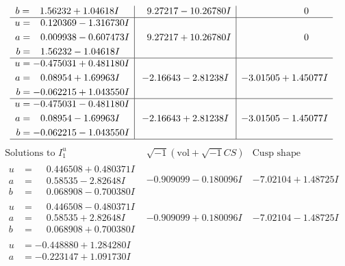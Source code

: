 \documentclass[1p]{elsarticle_modified}
\theoremstyle{definition}
\newcommand{\I}{\sqrt{-1}}
\begin{document}
$$\begin{array}{c|c|c}
\begin{aligned}
b &= \phantom{-}1.56232 + 1.04618 I\end{aligned}
 & \phantom{-}9.27217 - 10.26780 I & \phantom{-0.000000 } 0 \\ \hline\begin{aligned}
u &= \phantom{-}0.120369 - 1.316730 I \\
a &= \phantom{-}0.009938 - 0.607473 I \\
b &= \phantom{-}1.56232 - 1.04618 I\end{aligned}
 & \phantom{-}9.27217 + 10.26780 I & \phantom{-0.000000 } 0 \\ \hline\begin{aligned}
u &= -0.475031 + 0.481180 I \\
a &= \phantom{-}0.08954 + 1.69963 I \\
b &= -0.062215 + 1.043550 I\end{aligned}
 & -2.16643 - 2.81238 I & -3.01505 + 1.45077 I \\ \hline\begin{aligned}
u &= -0.475031 - 0.481180 I \\
a &= \phantom{-}0.08954 - 1.69963 I \\
b &= -0.062215 - 1.043550 I\end{aligned}
 & -2.16643 + 2.81238 I & -3.01505 - 1.45077 I\\
 \hline 
 \end{array}$$\newpage$$\begin{array}{c|c|c}  
\text{Solutions to }I^u_{1}& \I (\text{vol} + \sqrt{-1}CS) & \text{Cusp shape}\\
 \hline 
\begin{aligned}
u &= \phantom{-}0.446508 + 0.480371 I \\
a &= \phantom{-}0.58535 - 2.82648 I \\
b &= \phantom{-}0.068908 - 0.700380 I\end{aligned}
 & -0.909099 - 0.180096 I & -7.02104 + 1.48725 I \\ \hline\begin{aligned}
u &= \phantom{-}0.446508 - 0.480371 I \\
a &= \phantom{-}0.58535 + 2.82648 I \\
b &= \phantom{-}0.068908 + 0.700380 I\end{aligned}
 & -0.909099 + 0.180096 I & -7.02104 - 1.48725 I \\ \hline\begin{aligned}
u &= -0.448880 + 1.284280 I \\
a &= -0.223147 + 1.091730 I \\

\end{aligned}
\end{array}$$
\end{document}
